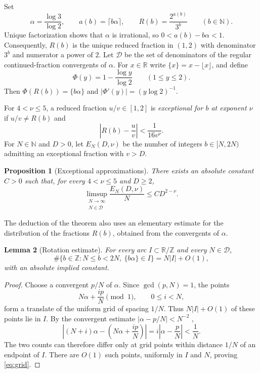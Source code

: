 \documentclass[11pt,reqno]{amsart}
\newtheorem{lemma}{Lemma}[section]
\newtheorem{proposition}[lemma]{Proposition}
\theoremstyle{definition}
\newcommand{\N}{\mathbb N}
\newcommand{\Z}{\mathbb Z}
\newcommand{\DD}{\mathcal D}
\begin{document}
Set
\[
 \alpha=\frac{\log3}{\log2},\qquad
 a(b)=\lceil b\alpha\rceil,\qquad
 R(b)=\frac{2^{a(b)}}{3^b}\qquad(b\in\N).
\]
Unique factorization shows that $\alpha$ is irrational, so
$0<a(b)-b\alpha<1$. Consequently, $R(b)$ is the unique reduced
fraction in $(1,2)$ with denominator $3^b$ and numerator a power
of $2$. Let $\DD$ be the set of denominators of the regular
continued-fraction convergents of $\alpha$. For $x\in\mathbb R$
write $\{x\}=x-\lfloor x\rfloor$, and define
\[
 \Phi(y)=1-\frac{\log y}{\log2}\qquad(1\le y\le2).
\]
Then $\Phi(R(b))=\{b\alpha\}$ and
$|\Phi'(y)|=(y\log2)^{-1}$.

For $4<\nu\le5$, a reduced fraction $u/v\in[1,2]$ is
\emph{exceptional for $b$ at exponent $\nu$} if
$u/v\ne R(b)$ and
\begin{equation}\label{eq:exception}
 \left|R(b)-\frac uv\right|<\frac1{16v^\nu}.
\end{equation}
For $N\in\N$ and $D>0$, let $E_N(D,\nu)$ be the number of
integers $b\in[N,2N)$ admitting an exceptional fraction
with $v>D$.

\begin{proposition}[Exceptional approximations]
\label{prop:count}
There exists an absolute constant $C>0$ such that,
for every $4<\nu\le5$ and $D\ge2$,
\[
 \limsup_{\substack{N\to\infty\\N\in\DD}}
 \frac{E_N(D,\nu)}{N}\le CD^{2-\nu}.
\]
\end{proposition}

The deduction of the theorem also uses an elementary
estimate for the distribution of the fractions $R(b)$,
obtained from the convergents of $\alpha$.

\begin{lemma}[Rotation estimate]\label{lem:rotation}
For every arc $I\subset\mathbb R/\mathbb Z$ and every
$N\in\DD$,
\begin{equation}\label{eq:grid}
 \#\{b\in\Z:N\le b<2N,\ \{b\alpha\}\in I\}
 =N|I|+O(1),
\end{equation}
with an absolute implied constant.
\end{lemma}

\begin{proof}
Choose a convergent $p/N$ of $\alpha$. Since
$\gcd(p,N)=1$, the points
\[
 N\alpha+\frac{ip}{N}\pmod1,\qquad 0\le i<N,
\]
form a translate of the uniform grid of spacing $1/N$.
Thus $N|I|+O(1)$ of these points lie in $I$.
By the convergent estimate
$|\alpha-p/N|<N^{-2}$
\cite[Corollary~1.4, p.~10]{Bugeaud},
\[
 \left|(N+i)\alpha-
 \left(N\alpha+\frac{ip}{N}\right)\right|
 =i\left|\alpha-\frac pN\right|<\frac1N.
\]
The two counts can therefore differ only at grid points
within distance $1/N$ of an endpoint of $I$. There are
$O(1)$ such points, uniformly in $I$ and $N$, proving
\eqref{eq:grid}.
\end{proof}
\end{document}
